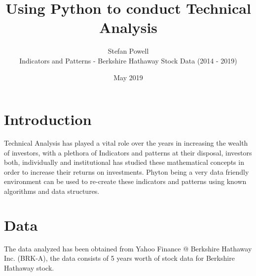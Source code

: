 \documentclass{article}%
\title{Using Python to conduct Technical Analysis}
\date{ May 2019}
\author{Stefan Powell \\  Indicators and Patterns - Berkshire Hathaway Stock Data (2014 - 2019) }
\begin{document}
\maketitle

\section{Introduction}
Technical Analysis has played a vital role over the years in increasing the wealth of investors, with a plethora of
Indicators and patterns at their disposal, investors both, individually and institutional has studied these mathematical concepts in order
to increase their returns on investments.  Phyton being a very data friendly environment can be used to re-create these indicators and patterns using known algorithms and data structures.

\section{Data}
The data analyzed has been obtained from Yahoo Finance @ Berkshire Hathaway Inc. (BRK-A), the data consists of 5 years worth of stock data for Berkshire Hathaway stock. 
\end{document}

